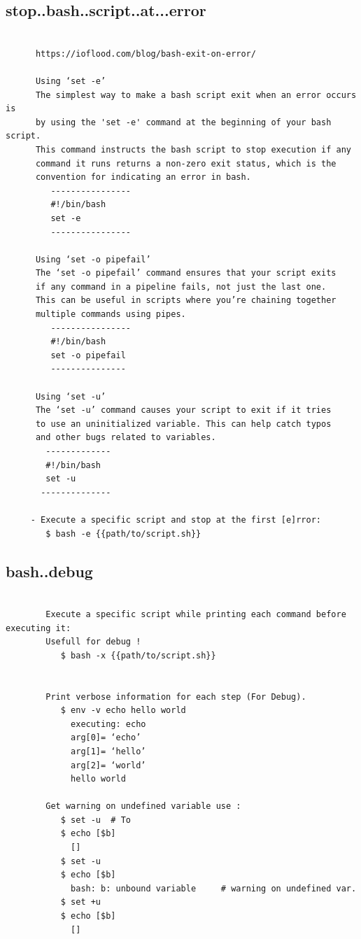 \documentclass[a4paper,12pt]{article}
\begin{document}
\subsection{stop..bash..script..at...error }
\begin{verbatim}
      
      https://ioflood.com/blog/bash-exit-on-error/
      
      Using ‘set -e’
      The simplest way to make a bash script exit when an error occurs is 
      by using the 'set -e' command at the beginning of your bash script. 
      This command instructs the bash script to stop execution if any 
      command it runs returns a non-zero exit status, which is the 
      convention for indicating an error in bash.
         ----------------
         #!/bin/bash         
         set -e
         ----------------
      
      Using ‘set -o pipefail’
      The ‘set -o pipefail’ command ensures that your script exits
      if any command in a pipeline fails, not just the last one.
      This can be useful in scripts where you’re chaining together 
      multiple commands using pipes.
         ----------------
         #!/bin/bash
         set -o pipefail
         ---------------
      
      Using ‘set -u’
      The ‘set -u’ command causes your script to exit if it tries
      to use an uninitialized variable. This can help catch typos
      and other bugs related to variables.
        -------------
        #!/bin/bash
        set -u 
       --------------
       
     - Execute a specific script and stop at the first [e]rror:
        $ bash -e {{path/to/script.sh}}          

\end{verbatim}

\subsection{bash..debug }
\begin{verbatim}
        
        Execute a specific script while printing each command before executing it:
        Usefull for debug !
           $ bash -x {{path/to/script.sh}}      


        Print verbose information for each step (For Debug).
           $ env -v echo hello world
             executing: echo
             arg[0]= ‘echo’
             arg[1]= ‘hello’
             arg[2]= ‘world’
             hello world
  
        Get warning on undefined variable use :
           $ set -u  # To 
           $ echo [$b]
             []
           $ set -u
           $ echo [$b]
             bash: b: unbound variable     # warning on undefined var.
           $ set +u
           $ echo [$b]
             []

\end{verbatim}
\end{document}
